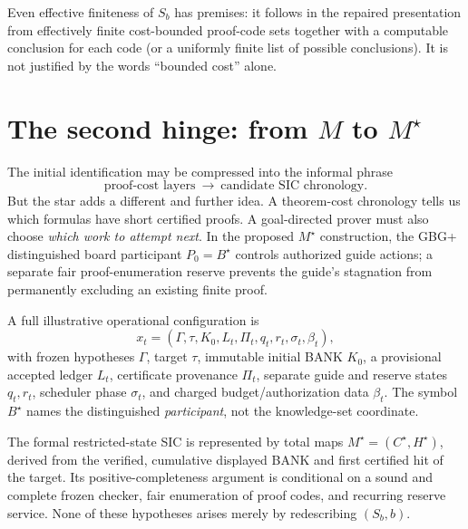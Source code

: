 \documentclass[11pt,letterpaper]{article}
\newcommand{\Ms}{M^{\star}}
\begin{document}
Even effective finiteness of $S_b$ has premises: it follows in the repaired presentation from effectively finite cost-bounded proof-code sets together with a computable conclusion for each code (or a uniformly finite list of possible conclusions). It is not justified by the words ``bounded cost'' alone.

\section{The second hinge: from $M$ to $\Ms$}
The initial identification may be compressed into the informal phrase
\[
\boxed{\text{proof-cost layers}\ \longrightarrow\ \text{candidate SIC chronology}.}
\]
But the star adds a different and further idea. A theorem-cost chronology tells us which formulas have short certified proofs. A goal-directed prover must also choose \emph{which work to attempt next}. In the proposed $\Ms$ construction, the GBG+ distinguished board participant $P_0=B^{\star}$ controls authorized guide actions; a separate fair proof-enumeration reserve prevents the guide's stagnation from permanently excluding an existing finite proof.

A full illustrative operational configuration is
\begin{equation}\label{eq:state}
x_t=(\Gamma,\tau,K_0,L_t,\Pi_t,q_t,r_t,\sigma_t,\beta_t),
\end{equation}
with frozen hypotheses $\Gamma$, target $\tau$, immutable initial BANK $K_0$, a provisional accepted ledger $L_t$, certificate provenance $\Pi_t$, separate guide and reserve states $q_t,r_t$, scheduler phase $\sigma_t$, and charged budget/authorization data $\beta_t$. The symbol $B^{\star}$ names the distinguished \emph{participant}, not the knowledge-set coordinate.

The formal restricted-state SIC is represented by total maps $\Ms=(C^{\star},H^{\star})$, derived from the verified, cumulative displayed BANK and first certified hit of the target. Its positive-completeness argument is conditional on a sound and complete frozen checker, fair enumeration of proof codes, and recurring reserve service. None of these hypotheses arises merely by redescribing $(S_b,b)$.

\begin{center}
\end{center}
\end{document}
